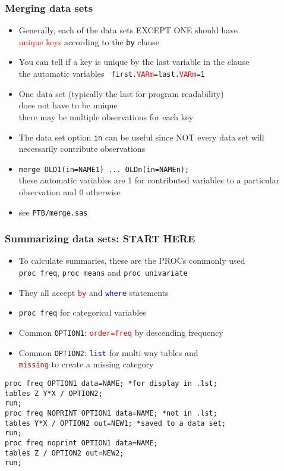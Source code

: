 \documentclass[11pt,pdftex,dvipsnames,usenames,helvetica]{beamer}
\begin{document}
\begin{frame}[fragile]
\frametitle{Merging data sets}
\begin{itemize}
\item Generally, each of the data sets EXCEPT ONE should have\\
  \textcolor{red}{unique keys} according to the {\tt by} clause
\item You can tell if a key is unique by the last variable in
the clause\\
  the automatic variables {\tt
    first.\textcolor{red}{VARm}=last.\textcolor{red}{VARm}=1} %
\item One data set (typically the last for program readability)\\
does not have to be unique\\
there may be multiple observations for each key
\item The data set option {\tt in} can be useful since NOT every
data set will necessarily contribute observations\\
\item {\tt {merge} OLD1(in=NAME1) ...\ OLDn(in=NAMEn);}\\
these automatic variables are 1 for contributed variables to 
a particular observation and 0 otherwise
\item see {\tt PTB/merge.sas}
\end{itemize}

\end{frame}

\begin{frame}[fragile]
\frametitle{Summarizing data sets: START HERE}
\begin{itemize}
\item To calculate summaries, these are the
PROCs commonly used\\
{\tt proc freq}, {\tt proc means} and {\tt proc univariate}
\item They all accept \textcolor{red}{\tt by} and 
\textcolor{blue}{\tt where} statements
\item {\tt proc freq} for categorical variables
\item Common {\tt OPTION1}: \textcolor{red}{\tt order=freq} by
  descending frequency
\item Common {\tt OPTION2}: \textcolor{blue}{\tt list} for multi-way
tables and\\ \textcolor{red}{\tt missing} to create a missing category
\end{itemize}
\begin{verbatim}
proc freq OPTION1 data=NAME; *for display in .lst;
tables Z Y*X / OPTION2;
run;
proc freq NOPRINT OPTION1 data=NAME; *not in .lst;
tables Y*X / OPTION2 out=NEW1; *saved to a data set;
run;
proc freq noprint OPTION1 data=NAME;
tables Z / OPTION2 out=NEW2;
run;
\end{verbatim}

\end{frame}
\end{document}

